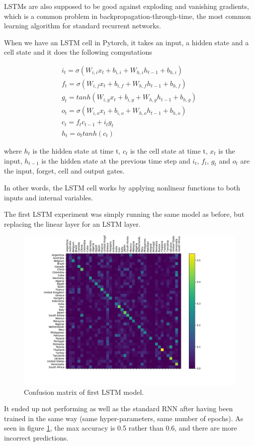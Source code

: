 \documentclass[runningheads]{llncs}
\begin{document}
LSTMs are also supposed to be good against exploding and vanishing gradients, which is a common problem in backpropagation-through-time, the most common learning algorithm for standard recurrent networks.


When we have an LSTM cell in Pytorch, it takes an input, a hidden state and a cell state and it does the following computations

\begin{gather}
	i_t = \sigma(W_{i,i} x_t + b_{i,i} + W_{h,i} h_{t-1} + b_{h,i}) \\
	f_t = \sigma(W_{i,f}x_t + b_{i,f} + W_{h,f}h_{t-1} + b_{h,f}) \\
	g_t = tanh(W_{i,g}x_t + b_{i,g} + W_{h,g}h_{t-1} + b_{h,g}) \\
	o_t = \sigma(W_{i,o}x_t + b_{i,o} + W_{h,o}h_{t-1} + b_{h,o}) \\
	c_t = f_tc_{t-1} + i_tg_t \\
	h_t = o_t tanh(c_t)
\end{gather}

where $h_t$ is the hidden state at time t, $c_t$ is the cell state at time t, $x_t$ is the input, $h_{t-1}$ is the hidden state at the previous time step and $i_t$, $f_t$, $g_t$ and $o_t$ are the input, forget, cell and output gates. \cite{torchdoc}

In other words, the LSTM cell works by applying nonlinear functions to both inputs and internal variables. 

 
The first LSTM experiment was simply running the same model as before, but replacing the linear layer for an LSTM layer.
 
\begin{figure}[h!]
	\centering
        \includegraphics[width=.5\textwidth]{../plots/conf_matrix_initial_LSTM.png}
	\caption{ Confusion matrix of first LSTM model.}
	\label{fig:conf_initial_lstm}
\end{figure}
 
It ended up not performing as well as the standard RNN after having been trained in the same way (same hyper-parameters, same number of epochs). As seen in figure \ref{fig:conf_initial_lstm}, the max accuracy is 0.5 rather than 0.6, and there are more incorrect predictions.
 
\end{document}
